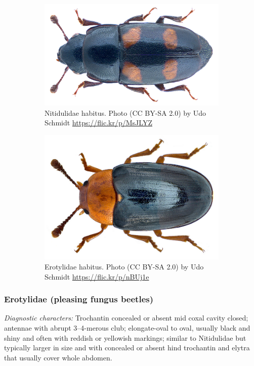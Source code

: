 \documentclass[letterpaper, 11pt]{article}
\begin{document}
\begin{figure}[ht!]
  \centering
\begin{subfigure}[ht!]{0.43\textwidth}
    \includegraphics[width=\textwidth]{NitidulidHabitus}
  \caption{Nitidulidae habitus. Photo (CC BY-SA 2.0) by Udo Schmidt \url{https://flic.kr/p/MsJLYZ}}
  \label{fig:nitidulid}
\end{subfigure}
    \qquad
\begin{subfigure}[ht!]{0.43\textwidth}
    \includegraphics[width=\textwidth]{ErotylidHabitus}
  \caption{Erotylidae habitus. Photo (CC BY-SA 2.0) by Udo Schmidt \url{https://flic.kr/p/nBUj1e}}
  \label{fig:erotylid}\end{subfigure}
    \caption{}\label{fig:erotylnitid}
\end{figure}

\subsubsection{Erotylidae (pleasing fungus beetles)}
\noindent{}\textit{Diagnostic characters:} Trochantin concealed or absent mid coxal cavity closed; antennae with abrupt 3--4-merous club; elongate-oval to oval, usually black and shiny and often with reddish or yellowish markings; similar to Nitidulidae but typically larger in size and with concealed or absent hind trochantin and elytra that usually cover whole abdomen.\\
\end{document}

